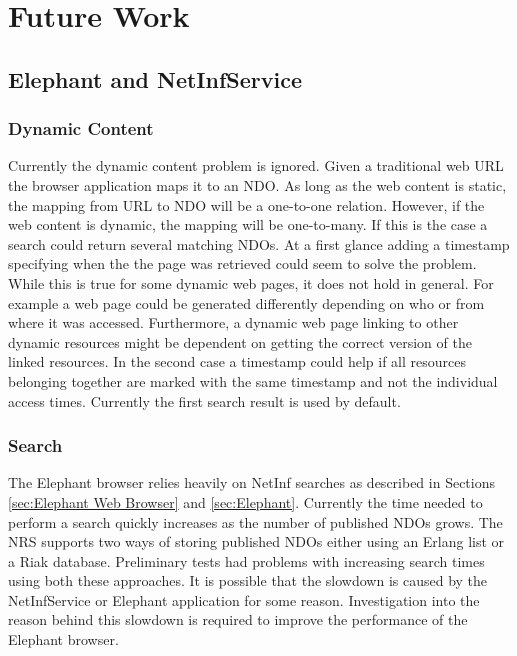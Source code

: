 \section{Future Work}

\subsection{Elephant and NetInfService}

\subsubsection{Dynamic Content}

Currently the dynamic content problem is ignored. Given a traditional web URL the browser application maps 
it to an NDO. As long as the web content is static, the mapping from URL to NDO will be a one-to-one relation. 
However, if the web content is dynamic, the mapping will be one-to-many. If this is the case a search could return 
several matching NDOs. At a first glance adding a timestamp specifying when the the page was retrieved could seem 
to solve the problem. While this is true for some dynamic web pages, it does not hold in general. For example a web 
page could be generated differently depending on who or from where it was accessed. Furthermore, a dynamic web page 
linking to other dynamic resources might be dependent on getting the correct version of the linked resources. In the 
second case a timestamp could help if all resources belonging together are marked with the same timestamp and not the 
individual access times. Currently the first search result is used by default.

\subsubsection{Search}

The Elephant browser relies heavily on NetInf searches as described in Sections \ref{sec:Elephant Web Browser} 
and \ref{sec:Elephant}. Currently the time needed to perform a search quickly increases as the number of published 
NDOs grows. The NRS supports two ways of storing published NDOs either using an Erlang list or a Riak database. 
Preliminary tests had problems with increasing search times using both these approaches. It is possible that the 
slowdown is caused by the NetInfService or Elephant application for some reason. Investigation into the reason behind 
this slowdown is required to improve the performance of the Elephant browser.


